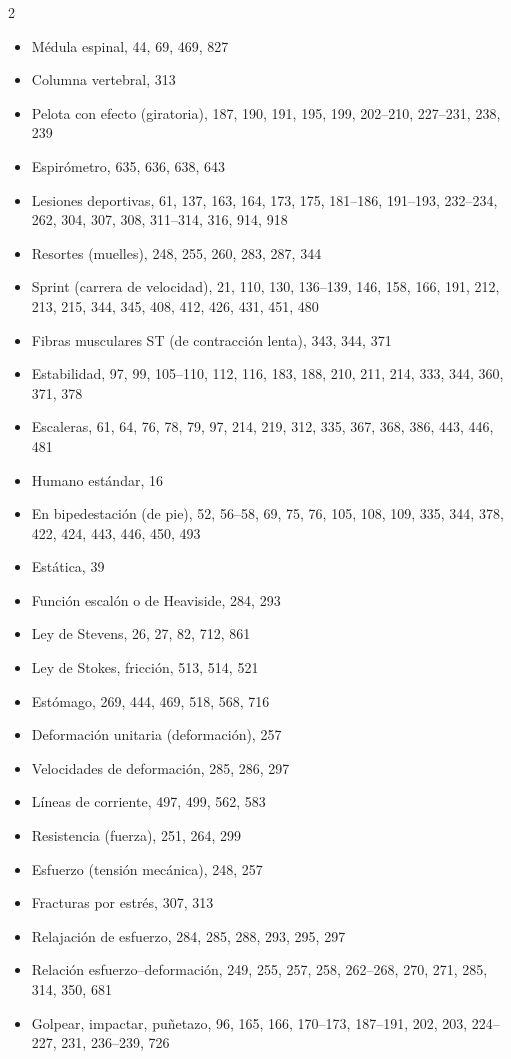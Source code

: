 \documentclass[12pt,a4paper]{book}
\begin{document}
\begin{multicols}{2}
\begin{itemize}[leftmargin=*]
  \item Médula espinal, 44, 69, 469, 827
  \item Columna vertebral, 313
  \item Pelota con efecto (giratoria), 187, 190, 191, 195, 199, 202--210, 227--231, 238, 239
  \item Espirómetro, 635, 636, 638, 643
  \item Lesiones deportivas, 61, 137, 163, 164, 173, 175, 181--186, 191--193, 232--234, 262, 304, 307, 308, 311--314, 316, 914, 918
  \item Resortes (muelles), 248, 255, 260, 283, 287, 344
  \item Sprint (carrera de velocidad), 21, 110, 130, 136--139, 146, 158, 166, 191, 212, 213, 215, 344, 345, 408, 412, 426, 431, 451, 480
  \item Fibras musculares ST (de contracción lenta), 343, 344, 371
  \item Estabilidad, 97, 99, 105--110, 112, 116, 183, 188, 210, 211, 214, 333, 344, 360, 371, 378
  \item Escaleras, 61, 64, 76, 78, 79, 97, 214, 219, 312, 335, 367, 368, 386, 443, 446, 481
  \item Humano estándar, 16
  \item En bipedestación (de pie), 52, 56--58, 69, 75, 76, 105, 108, 109, 335, 344, 378, 422, 424, 443, 446, 450, 493
  \item Estática, 39
  \item Función escalón o de Heaviside, 284, 293
  \item Ley de Stevens, 26, 27, 82, 712, 861
  \item Ley de Stokes, fricción, 513, 514, 521
  \item Estómago, 269, 444, 469, 518, 568, 716
  \item Deformación unitaria (deformación), 257
  \item Velocidades de deformación, 285, 286, 297
  \item Líneas de corriente, 497, 499, 562, 583
  \item Resistencia (fuerza), 251, 264, 299
  \item Esfuerzo (tensión mecánica), 248, 257
  \item Fracturas por estrés, 307, 313
  \item Relajación de esfuerzo, 284, 285, 288, 293, 295, 297
  \item Relación esfuerzo--deformación, 249, 255, 257, 258, 262--268, 270, 271, 285, 314, 350, 681
  \item Golpear, impactar, puñetazo, 96, 165, 166, 170--173, 187--191, 202, 203, 224--227, 231, 236--239, 726

\end{itemize}
\end{multicols}
\end{document}
